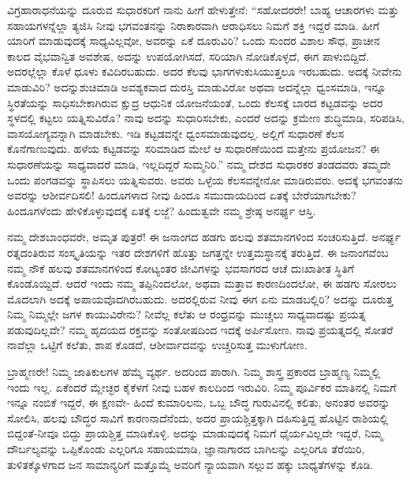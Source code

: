 ವಿಗ್ರಹಾರಾಧನೆಯನ್ನು ದೂರುವ ಸುಧಾರಕರಿಗೆ ನಾನು ಹೀಗೆ ಹೇಳುತ್ತೇನೆ: “ಸಹೋದರರೇ! ಬಾಹ್ಯ ಆಚಾರಗಳು ಮತ್ತು ಸಹಾಯಗಳನ್ನೆಲ್ಲಾ ತ್ಯಜಿಸಿ ನೀವು ಭಗವಂತನನ್ನು ನಿರಾಕಾರವಾಗಿ ಆರಾಧಿಸಲು ನಿಮಗೆ ಶಕ್ತಿ ಇದ್ದರೆ ಮಾಡಿ. ಹೀಗೆ ಯಾರಿಗೆ ಮಾಡುವುದಕ್ಕೆ ಸಾಧ್ಯವಿಲ್ಲವೋ, ಅವರನ್ನು ಏಕೆ ದೂರುವಿರಿ? ಒಂದು ಸುಂದರ ವಿಶಾಲ ಸೌಧ, ಪ್ರಾಚೀನ ಕಾಲದ ವೈಭವಾನ್ವಿತ ಅವಶೇಷ, ಅದನ್ನು ಉಪಯೋಗಿಸದೆ, ಸರಿಯಾಗಿ ನೋಡಿಕೊಳ್ಳದೆ, ಈಗ ಪಾಳುಬಿದ್ದಿದೆ. ಅದರಲ್ಲೆಲ್ಲಾ ಕೊಳೆ ಧೂಳು ಕವಿದಿರಬಹುದು. ಅದರ ಕೆಲವು ಭಾಗಗಳು\break ಕುಸಿಯುತ್ತಲೂ ಇರಬಹುದು. ಅದಕ್ಕೆ ನೀವೇನು ಮಾಡುವಿರಿ? ಅದನ್ನು\break ಶುಚಿಮಾಡಿ ಅವಶ್ಯಕವಾದ ದುರಸ್ತಿ ಮಾಡುವಿರೋ ಅಥವಾ ಅದನ್ನೆಲ್ಲಾ ಧ್ವಂಸಮಾಡಿ, ಇನ್ನೂ ಸ್ಥಿರತೆಯನ್ನು ಸಾಧಿಸಬೇಕಾಗಿರುವ ಕ್ಷುದ್ರ ಆಧುನಿಕ ಯೋಜನೆ\-ಯಂತೆ, ಒಂದು ಕೆಲಸಕ್ಕೆ ಬಾರದ ಕಟ್ಟಡವನ್ನು ಅದರ ಸ್ಥಳದಲ್ಲಿ ಕಟ್ಟಲು ಯತ್ನಿಸುವಿರೊ? ನಾವು ಅದನ್ನು ಸುಧಾರಿಸಬೇಕು, ಎಂದರೆ ಅದನ್ನು ಕ್ರಮೇಣ ಶುದ್ಧಿಮಾಡಿ, ಸರಿಪಡಿಸಿ, ವಾಸಯೋಗ್ಯವನ್ನಾಗಿ ಮಾಡಬೇಕು. ಇಡಿ ಕಟ್ಟಡವನ್ನೇ ಧ್ವಂಸಮಾಡುವುದಲ್ಲ. ಅಲ್ಲಿಗೆ ಸುಧಾರಣೆ ಕೆಲಸ ಕೊನೆಗಾಣುವುದು. ಹಳೆಯ ಕಟ್ಟಡವನ್ನು ಸರಿಮಾಡಿದ ಮೇಲೆ ಆ ಸುಧಾರಣೆಯಿಂದ ಮತ್ತೇನು ಪ್ರಯೋಜನ? ಈ ಸುಧಾರಣೆಯನ್ನು ಸಾಧ್ಯವಾದರೆ ಮಾಡಿ, ಇಲ್ಲದಿದ್ದರೆ ಸುಮ್ಮನಿರಿ.” ನಮ್ಮ ದೇಶದ ಸುಧಾರಕರ ತಂಡದವರು ತಮ್ಮದೇ ಒಂದು ಪಂಗಡವನ್ನು ಸ್ಥಾಪಿಸಲು ಯತ್ನಿಸುವರು. ಅವರು ಒಳ್ಳೆಯ ಕೆಲಸವನ್ನೇನೋ ಮಾಡಿರುವರು. ಅದಕ್ಕೆ ಭಗವಂತನು ಅವರನ್ನು ಆಶೀರ್ವದಿಸಲಿ! ಹಿಂದೂಗಳಾದ ನೀವು ಹಿಂದೂ ಸಮುದಾಯದಿಂದ ಏತಕ್ಕೆ ಬೇರೆಯಾಗಬೇಕು? ಹಿಂದೂಗಳೆಂದು ಹೇಳಿಕೊಳ್ಳುವುದಕ್ಕೆ ಏತಕ್ಕೆ ಲಜ್ಜೆ? ಹಿಂದುತ್ವವೇ ನಮ್ಮ ಶ್ರೇಷ್ಠ ಅನರ್ಘ್ಯ ಆಸ್ತಿ.

ನಮ್ಮ ದೇಶಬಾಂಧವರೇ, ಅಮೃತ ಪುತ್ರರೆ! ಈ ಜನಾಂಗದ ಹಡಗು ಹಲವು ಶತಮಾನಗಳಿಂದ ಸಂಚರಿಸುತ್ತಿದೆ. ಅನರ್ಘ್ಯ ರತ್ನದಂತಿರುವ ಸಂಸ್ಕೃತಿಯನ್ನು ಇತರ ದೇಶಗಳಿಗೆ ಹೊತ್ತು ಜಗತ್ತನ್ನೇ ಉತ್ತಮಸ್ಥಾನಕ್ಕೆ ತರುತ್ತಿದೆ. ಈ ಜನಾಂಗವೆಂಬ ನಮ್ಮ ನೌಕೆ ಹಲವು ಶತಮಾನಗಳಿಂದ ಕೋಟ್ಯಂತರ ಜೀವಿಗಳನ್ನು ಭವಸಾಗರದ ಆಚೆ ದುಃಖಾತೀತ ಸ್ಥಿತಿಗೆ ಕೊಂಡೊಯ್ದಿದೆ. ಆದರೆ ಇಂದು ನಮ್ಮ ತಪ್ಪಿನಿಂದಲೋ, ಅಥವಾ ಮತ್ತಾವ ಕಾರಣದಿಂದಲೋ, ಈ ಹಡಗು ಸೋರಲು ಮೊದಲಾಗಿ ಅದಕ್ಕೆ ಅಪಾಯವೊದಗಿರಬಹುದು. ಅದರಲ್ಲಿರುವ ನೀವು ಈಗ ಏನು ಮಾಡಬಲ್ಲಿರಿ? ಅದನ್ನು ದೂರುತ್ತ ನಿಮ್ಮ ನಿಮ್ಮಲ್ಲೇ ಜಗಳ ಕಾಯುವಿರೇನು? ನೀವೆಲ್ಲ ಕಲೆತು ಆ ರಂಧ್ರವನ್ನು ಮುಚ್ಚಲು ಸಾಧ್ಯವಾದಷ್ಟು ಪ್ರಯತ್ನ ಪಡುವುದಿಲ್ಲವೇ? ನಮ್ಮ ಹೃದಯದ ರಕ್ತವನ್ನು ಸಂತೋಷದಿಂದ ಇದಕ್ಕೆ ಅರ್ಪಿಸೋಣ. ನಾವು ಪ್ರಯತ್ನದಲ್ಲಿ ಸೋತರೆ ನಾವೆಲ್ಲಾ ಒಟ್ಟಿಗೆ ಕಲೆತು, ಶಾಪ ಕೊಡದೆ, ಆಶೀರ್ವಾದವನ್ನು ಉಚ್ಚರಿಸುತ್ತ ಮುಳುಗೋಣ.

ಬ್ರಾಹ್ಮಣರೇ! ನಿಮ್ಮ ಜಾತಿಕುಲಗಳ ಹೆಮ್ಮೆ ವ್ಯರ್ಥ. ಅದರಿಂದ ಪಾರಾಗಿ. ನಿಮ್ಮ ಶಾಸ್ತ್ರ ಪ್ರಕಾರದ ಬ್ರಾಹ್ಮಣ್ಯ ನಿಮ್ಮಲ್ಲಿ ಇಂದು ಇಲ್ಲ. ಏಕೆಂದರೆ ಮ್ಲೇಚ್ಛರ ಕೈಕೆಳಗೆ ನೀವು ಬಹಳ ಕಾಲದಿಂದ ಇರುವಿರಿ. ನಿಮ್ಮ ಪೂರ್ವಿಕರ ಮಾತಿನಲ್ಲಿ ನಿಮಗೆ ಇನ್ನೂ ನಂಬಿಕೆ ಇದ್ದರೆ, ಈ ಕ್ಷಣವೇ- ಹಿಂದೆ ಕುಮಾರಿಲನು, ಒಬ್ಬ ಬೌದ್ಧ ಗುರುವಿನಲ್ಲಿ ಕಲಿತು, ಅನಂತರ ಅವರನ್ನು ಸೋಲಿಸಿ, ಹಲವು ಬೌದ್ಧರ ಸಾವಿಗೆ ಕಾರಣನಾದೆನೆಂದು, ಅದರ ಪ್ರಾಯಶ್ಚಿತ್ತಕ್ಕಾಗಿ ದಹಿಸುತ್ತಿದ್ದ ಹೊಟ್ಟಿನ ರಾಶಿಯಲ್ಲಿ ಬಿದ್ದಂತೆ-ನೀವೂ ಬಿದ್ದು ಪ್ರಾಯಶ್ಚಿತ್ತ ಮಾಡಿಕೊಳ್ಳಿ. ಅದನ್ನು ಮಾಡುವುದಕ್ಕೆ ನಿಮಗೆ ಧೈರ್ಯವಿಲ್ಲದೇ ಇದ್ದರೆ, ನಿಮ್ಮ ದೌರ್ಬಲ್ಯವನ್ನು ಒಪ್ಪಿಕೊಂಡು ಎಲ್ಲರಿಗೂ ಸಹಾಯಮಾಡಿ, ಜ್ಞಾನಾಗಾರದ ಬಾಗಿಲನ್ನು ಎಲ್ಲರಿಗೂ ತೆರೆಯಿರಿ, ತುಳಿತಕ್ಕೊಳಗಾದ ಜನ ಸಾಮಾನ್ಯರಿಗೆ ಮತ್ತೊಮ್ಮೆ ಅವರಿಗೆ ನ್ಯಾಯವಾಗಿ ಸಲ್ಲುವ ಹಕ್ಕು ಬಾಧ್ಯತೆಗಳನ್ನು ಕೊಡಿ.


